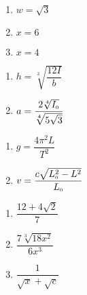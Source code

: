 \documentclass[11pt]{article}
\theoremstyle{definition}  %
\newcounter{HW}
\begin{document}
\begin{multicols}{3}
\begin{enumerate}
\setcounter{enumi}{\value{HW}}


\item $w = \sqrt{3}$
\item $x = 6$
\item $x = 4$


\setcounter{HW}{\value{enumi}}
\end{enumerate}
\end{multicols}


\begin{multicols}{2}
\begin{enumerate}
\setcounter{enumi}{\value{HW}}


\item $h = \sqrt[3]{\dfrac{12I}{b}}$ 

\item  $a = \dfrac{2 \sqrt[4]{I_{\text{\tiny $0$}}}}{\sqrt[4]{5\sqrt{3}}}$

\setcounter{HW}{\value{enumi}}
\end{enumerate}
\end{multicols}


\begin{multicols}{2}
\begin{enumerate}
\setcounter{enumi}{\value{HW}}


\item $g = \dfrac{4 \pi^2 L}{T^2}$ 

\item $v = \dfrac{c \sqrt{L_{\text{\tiny $0$}}^2 - L^2}}{L_{\text{\tiny $0$}}}$  

\setcounter{HW}{\value{enumi}}
\end{enumerate}
\end{multicols}




\begin{multicols}{3}
\begin{enumerate}
\setcounter{enumi}{\value{HW}}


\item   $\dfrac{12 + 4\sqrt{2}}{7}$  

\item  $\dfrac{7 \sqrt[3]{18x^2}}{6x^3}$

\item   $\dfrac{1}{\sqrt{x}+ \sqrt{c}}$ 

\setcounter{HW}{\value{enumi}}
\end{enumerate}
\end{multicols}
\end{document}
